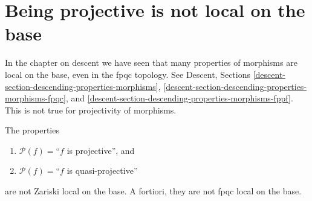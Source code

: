 \section{Being projective is not local on the base}
\label{section-non-descending-property-projective}

\noindent
In the chapter on descent we have seen that many properties of morphisms
are local on the base, even in the fpqc topology. See
Descent, Sections \ref{descent-section-descending-properties-morphisms},
\ref{descent-section-descending-properties-morphisms-fpqc}, and
\ref{descent-section-descending-properties-morphisms-fppf}.
This is not true for projectivity of morphisms.

\begin{lemma}
\label{lemma-non-descending-property-projective}
The properties
\begin{enumerate}
\item[] $\mathcal{P}(f) =$``$f$ is projective'', and
\item[] $\mathcal{P}(f) =$``$f$ is quasi-projective''
\end{enumerate}
are not Zariski local on the base. A fortiori, they are not fpqc local
on the base.
\end{lemma}

